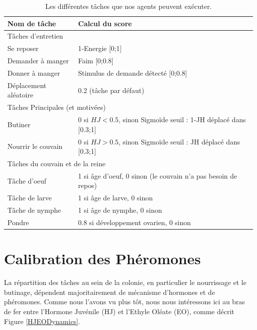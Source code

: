 		\begin{table}
        \centering
        \caption{Les différentes tâches que nos agents peuvent exécuter.}
        \begin{tabular}{|l|l|}
            \hline
            Nom de tâche & Calcul du score\\
            \hline
            \hline
            \multicolumn{2}{|l|}{Tâches d'entretien}\\
            \hline
            Se reposer & 1-Energie [0;1]\\
            Demander à manger & Faim [0;0.8] \\
            Donner à manger & Stimulus de demande détecté [0;0.8] \\
            Déplacement aléatoire & 0.2 (tâche par défaut) \\
            \hline
            \hline
            \multicolumn{2}{|l|}{Tâches Principales (et motivées)}\\
            \hline
            Butiner & 0 si $HJ<0.5$, sinon Sigmoïde seuil : 1-JH déplacé dans [0.3;1] \\
            Nourrir le couvain & 0 si $HJ>0.5$, sinon Sigmoïde seuil : JH déplacé dans [0.3;1] \\
            \hline
            \hline
            \multicolumn{2}{|l|}{Tâches du couvain et de la reine}\\
            \hline
            Tâche d'oeuf & 1 si âge d'oeuf, 0 sinon (le couvain n'a pas besoin de repos)\\
            Tâche de larve & 1 si âge de larve, 0 sinon\\
            Tâche de nymphe & 1 si âge de nymphe, 0 sinon \\
            Pondre & 0.8 si développement ovarien, 0 sinon\\
            \hline
            
        \end{tabular}
        \label{tableTasks}
    \end{table}
    
	\section{Calibration des Phéromones}
	
	La répartition des tâches au sein de la colonie, en particulier le nourrissage et le butinage, dépendent majoritairement de mécanisme d'hormones et de phéromones. Comme nous l'avons vu plus tôt, nous nous intéressons ici au bras de fer entre l'Hormone Juvénile (HJ) et l'Ethyle Oléate (EO), comme décrit Figure \ref{HJEODynamics}.
	
